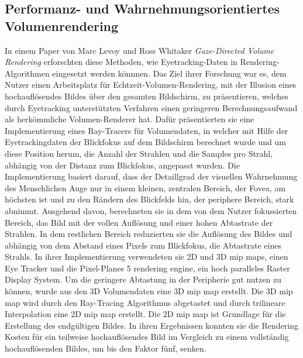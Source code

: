 \subsection{Performanz- und Wahrnehmungsorientiertes Volumenrendering}\label{ss::pfwov}
In einem Paper von Marc Levoy und Ross Whitaker \emph{Gaze-Directed Volume Rendering} \cite{Levoy:1990:GVR:91385.91449} erforschten diese Methoden, wie Eyetracking-Daten in Rendering-Algorithmen eingesetzt werden könnnen.
Das Ziel ihrer Forschung war es, dem Nutzer einen Arbeitsplatz für Echtzeit-Volumen-Rendering, mit der Illusion eines hochauflösendes Bildes über den gesamten Bildschirm, zu präsentieren, welches durch Eyetracking unterstützten Verfahren einen geringeren Berechnungsaufwand als herkömmliche Volumen-Renderer hat.
Dafür präsentierten sie eine Implementierung eines Ray-Tracers für Volumendaten, in welcher mit Hilfe der Eyetrackingdaten der Blickfokus auf dem Bildschirm berechnet wurde und um diese Position herum, die Anzahl der Strahlen und die Samples pro Strahl, abhängig von der Distanz zum Blickfokus, angepasst wurden.
Die Implementierung basiert darauf, dass der Detaillgrad der visuellen Wahrnehmung des Menschlichen Auge nur in einem kleinen, zentralen Bereich, der Fovea, am höchsten ist und zu den Rändern des Blickfelds hin, der periphere Bereich, stark abnimmt.
Ausgehend davon, berechneten sie in dem von dem Nutzer fokussierten Bereich, das Bild mit der vollen Auflösung und einer hohen Abtastrate der Strahlen.
In dem restlichen Bereich reduzierten sie die Auflösung des Bildes und abhängig von dem Abstand eines Pixels zum Blickfokus, die Abtastrate eines Strahls.
In ihrer Implementierung verwendeten sie 2D und 3D mip maps, einen Eye Tracker und die Pixel-Planes 5 rendering engine, ein hoch paralleles Raster Display System.
Um die geringere Abtastung in der Peripherie gut nutzen zu können, wurde aus den 3D Volumendaten eine 3D mip map erstellt.
Die 3D mip map wird durch den Ray-Tracing Algorithmus abgetastet und durch trilineare Interpolation eine 2D mip map erstellt.
Die 2D mip map ist Grundlage für die Erstellung des endgültigen Bildes.
In ihren Ergebnissen konnten sie die Rendering Kosten für ein teilweise hochauflösendes Bild im Vergleich zu einem vollständig hochauflösenden Bildes, um bis den Faktor fünf, senken.

